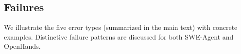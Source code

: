 \subsection*{Failures}
We illustrate the five error types (summarized in the main text) with concrete examples. Distinctive failure patterns are discussed for both SWE-Agent and OpenHands.

